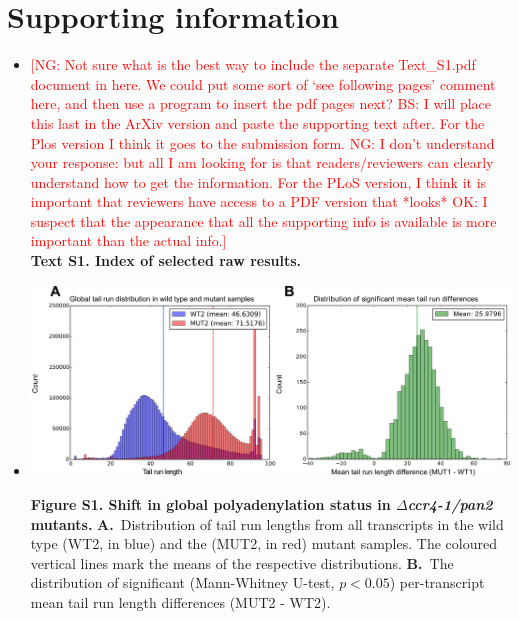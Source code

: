 \documentclass[10pt]{article}
\newcommand{\note}[1]{\textcolor{red}{[#1]}}  %
\begin{document}
\newpage 

\section*{Supporting information}

\begin{itemize}

\item[]{
\note{NG: Not sure what is the best way to include the separate Text\_S1.pdf document in here.  We could put some sort of `see following pages' comment here, and then use a program to insert the pdf pages next?  BS: I will place this last in the ArXiv version and paste the supporting text after. For the Plos version I think it goes to the submission form. NG: I don't understand your response: but all I am looking for is that readers/reviewers can clearly understand how to get the information.  For the PLoS version, I think it is important that reviewers have access to a PDF version that *looks* OK:  I suspect that the appearance that all the supporting info is available is more important than the actual info.} \\
\textbf{Text S1. Index of selected raw results.}
}
\newpage

\item[]{
\begin{center}
\includegraphics[scale=0.9]{FigureS1.png}
\end{center}

\textbf{Figure S1. Shift in global polyadenylation status in \textit{$\Delta$ccr4-1/pan2} mutants.} \textbf{A.}~Distribution of tail run lengths from all transcripts in the wild type (WT2, in blue) and the (MUT2, in red) mutant samples. The coloured vertical lines mark the means of the respective distributions.
\textbf{B.}~The distribution of significant (Mann-Whitney U-test, $p < 0.05$) per-transcript mean tail run length differences (MUT2 - WT2).
}
\newpage


\end{itemize}
\end{document}
